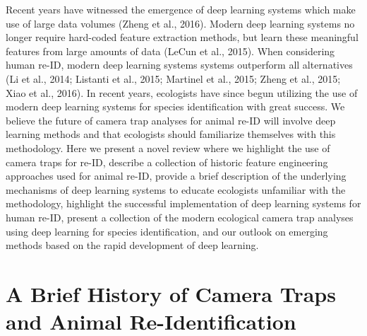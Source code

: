 \documentclass[11pt]{article}
\begin{document}
Recent years have witnessed the emergence of deep learning systems which make use of large data volumes (Zheng et al., 2016). Modern deep learning systems no longer require hard-coded feature extraction methods, but learn these meaningful features from large amounts of data (LeCun et al., 2015). When considering human re-ID, modern deep learning systems systems outperform all alternatives (Li et al., 2014; Listanti et al., 2015; Martinel et al., 2015; Zheng et al., 2015; Xiao et al., 2016). In recent years, ecologists have since begun utilizing the use of modern deep learning systems for species identification with great success. We believe the future of camera trap analyses for animal re-ID will involve deep learning methods and that ecologists should familiarize themselves with this methodology. Here we present a novel review where we highlight the use of camera traps for re-ID, describe a collection of historic feature engineering approaches used for animal re-ID, provide a brief description of the underlying mechanisms of deep learning systems to educate ecologists unfamiliar with the methodology, highlight the successful implementation of deep learning systems for human re-ID, present a collection of the modern ecological camera trap analyses using deep learning for species identification, and our outlook on emerging methods based on the rapid development of deep learning.
\newline
\\

\section*{A Brief History of Camera Traps and Animal Re-Identification}
\end{document}
